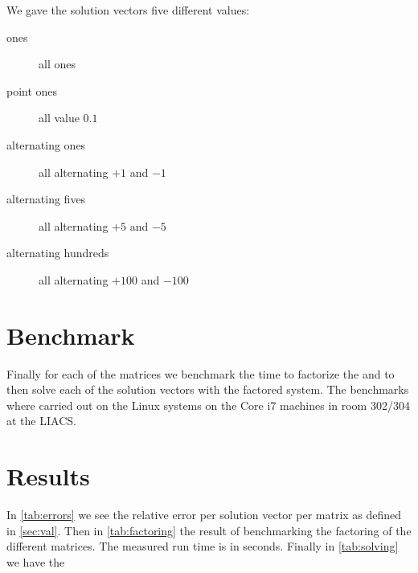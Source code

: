 \documentclass[10pt]{article}
\begin{document}
We gave the solution vectors five different values:

\begin{description}
    \item [ones] all ones
    \item [point ones] all value $0.1$
    \item [alternating ones] all alternating $+1$ and $-1$
    \item [alternating fives] all alternating $+5$ and $-5$
    \item [alternating hundreds] all alternating $+100$ and $-100$
\end{description}

\section{Benchmark}
Finally for each of the matrices we benchmark the time to factorize the and to then solve each of the solution vectors with the factored system. The benchmarks where carried out on the Linux systems on the Core i7 machines in room 302/304 at the LIACS.

\section{Results}
In \autoref{tab:errors} we see the relative error per solution vector per matrix as defined in \autoref{sec:val}. Then in \autoref{tab:factoring} the result of benchmarking the factoring of the different matrices. The measured run time is in seconds. Finally in \autoref{tab:solving} we have the 
\end{document}
